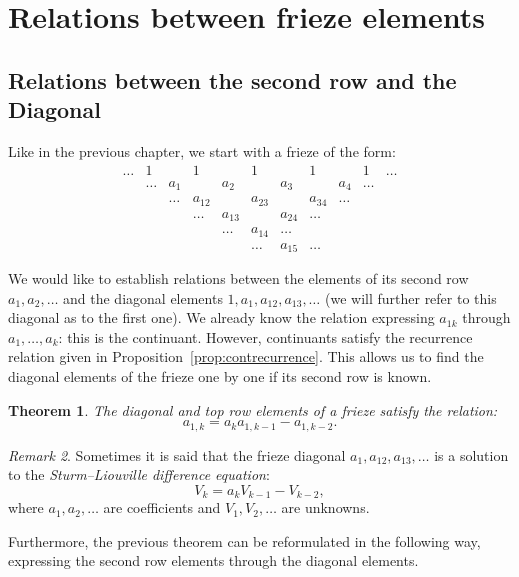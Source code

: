 \documentclass[a4paper,11pt]{amsart}
\theoremstyle{plain}
\newtheorem{theorem}{Theorem}[section]
\theoremstyle{remark}
\newtheorem{remark}[theorem]{Remark}
\theoremstyle{definition}
\numberwithin{equation}{section}
\numberwithin{figure}{section}
\begin{document}

\section{Relations between frieze elements}\label{sec:relations}

\subsection{Relations between the second row and the Diagonal}

Like in the previous chapter, we start with a frieze of the form:
\[
\begin{array}{ccccccccccccccccccccc}
\dots &1 && 1&& 1&& 1& &1&\dots\\
&\dots & a_1 && a_2  && a_3 &&a_4 & \dots\\
&& \dots & a_{12} && a_{23} && a_{34} &\dots\\
&&&\dots & a_{13}& &a_{24}& \dots \\
&&&&\dots & a_{14} &\dots\\
&&&&&\dots&a_{15}&\dots
\end{array}
\]

We would like to establish relations between the elements of its second row $a_1,a_2,\dots$ and the diagonal elements $1,a_1,a_{12},a_{13},\dots$ (we will further refer to this diagonal as to the first one). We already know the relation expressing $a_{1k}$ through $a_1,\dots,a_k$: this is the continuant. However, continuants satisfy the recurrence relation given in Proposition~\ref{prop:contrecurrence}. This allows us to find the diagonal elements of the frieze one by one if its second row is known.

\begin{theorem}\label{thm:diagfrom2} The diagonal and top row elements of a frieze satisfy the relation:
\[
a_{1,k}=a_{k}a_{1,k-1}-a_{1,k-2}.
\]
\end{theorem}

\begin{remark}
Sometimes it is said that the frieze diagonal $a_1,a_{12},a_{13},\dots$ is a solution to the \emph{Sturm--Liouville difference equation}:
\[
V_k=a_kV_{k-1}-V_{k-2},
\]
where $a_1,a_2,\dots$ are coefficients and $V_1,V_2,\dots$ are unknowns.
\end{remark}

Furthermore, the previous theorem can be reformulated in the following way, expressing the second row elements through the diagonal elements.
\end{document}
